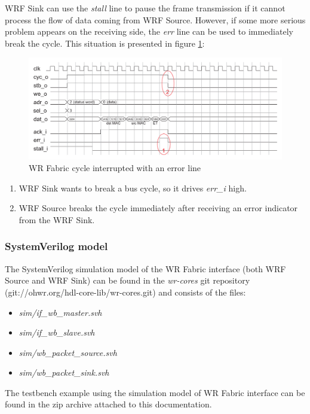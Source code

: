 WRF Sink can use the \emph{stall} line to pause the frame transmission if it cannot
process the flow of data coming from WRF Source. However, if some more serious
problem appears on the receiving side, the \emph{err} line can be used to
immediately break the cycle. This situation is presented in figure
\ref{fig:fabric:cycerr}:
\begin{figure}[ht]
  \begin{center}
    \includegraphics[width=\textwidth]{fig/basic_wrf_cycle_err.pdf}
    \caption{WR Fabric cycle interrupted with an error line}
    \label{fig:fabric:cycerr}
  \end{center}
\end{figure}
\begin{enumerate}
  \item WRF Sink wants to break a bus cycle, so it drives \emph{err\_i} high.
  \item WRF Source breaks the cycle immediately after receiving an error indicator
    from the WRF Sink.
\end{enumerate}

\subsubsection{SystemVerilog model}
The SystemVerilog simulation model of the WR Fabric interface (both WRF Source and 
WRF Sink) can be found in the \emph{wr-cores} git repository
(git://ohwr.org/hdl-core-lib/wr-cores.git) and consists of the files:
\begin{itemize}
  \item \emph{sim/if\_wb\_master.svh}
  \item \emph{sim/if\_wb\_slave.svh}
  \item \emph{sim/wb\_packet\_source.svh}
  \item \emph{sim/wb\_packet\_sink.svh}
\end{itemize}

The testbench example using the simulation model of WR Fabric interface can
be found in the zip archive attached to this documentation.
